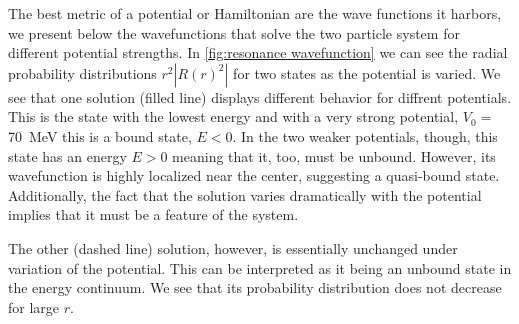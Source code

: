 \documentclass[../main/report.tex]{subfiles}
\begin{document}
The best metric of a potential or Hamiltonian are the wave functions it harbors, we present below the wavefunctions that solve the two particle system for different potential strengths.
In \cref{fig:resonance wavefunction} we can see the radial probability distributions $r^2|R(r)^2|$ for two states as the potential is varied.
 We see that one solution (filled line) displays different behavior for diffrent potentials.
 This is the state with the lowest energy and with a very strong potential, $V_0 =$ \SI{70}{MeV} this is a bound state, $E<0$. 
In the two weaker potentials, though, this state has an energy $E>0$ meaning that it, too, must be unbound. 
However, its wavefunction is highly localized near the center, suggesting a quasi-bound state. 
Additionally, the fact that the solution varies dramatically with the potential implies that it must be a feature of the system.
 
The other (dashed line) solution, however, is essentially unchanged under variation of the potential. 
This can be interpreted as it being an unbound state in the energy continuum. We see that its probability distribution does not decrease for large $r$. 




\end{document}
